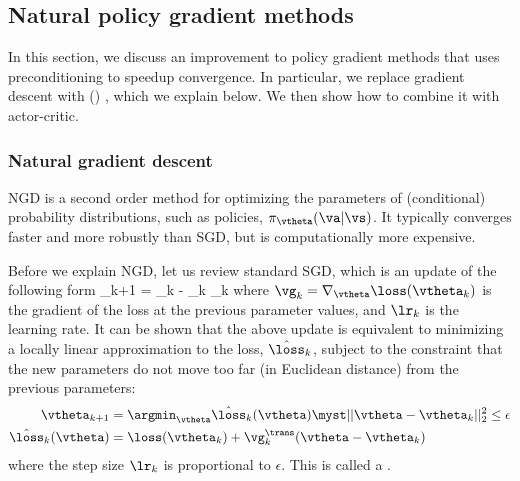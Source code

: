\subsection{Natural policy gradient methods}
\label{sec:naturalAC}
\label{sec:naturalPG}
\label{sec:NPG}


In this section, we discuss an improvement to policy
gradient methods that uses preconditioning to speedup convergence.
In particular, we replace gradient descent with  
 ()
\citep{Amari1998,Martens2020},
which we explain below. We then show how to combine it with actor-critic.


\subsubsection{Natural gradient descent}

NGD is a second order method
for optimizing the parameters of
(conditional) probability distributions, such as policies,
$\pi_{\vtheta}(\va|\vs)$.
It typically converges faster and more robustly than
SGD, but is computationally more expensive.

Before we explain NGD, let us review standard
SGD, which is an update of the following form
\be
\vtheta_{k+1} = \vtheta_k - \lr_k \vg_k
\ee
where $\vg_k = \nabla_{\vtheta} \loss(\vtheta_k)$
is the gradient of the loss at the previous parameter values,
and $\lr_k$ is the learning rate.
It can be shown that the above update is equivalent
to minimizing a locally linear approximation to the loss,
$\hat{\loss}_k$,
subject to the constraint that
the new parameters do not move too far (in Euclidean distance)
from the previous parameters:
\begin{align}
\vtheta_{k+1} &= \argmin_{\vtheta}
\hat{\loss}_k(\vtheta) \myst ||\vtheta-\vtheta_k||_2^2 \leq \epsilon
\\
\hat{\loss}_k(\vtheta) &= \loss(\vtheta_k) + \vg_k^\trans(\vtheta-\vtheta_k)
\end{align}
where the step size $\lr_k$ is  proportional to $\epsilon$.
This is called a 
\citep{proximal}.

